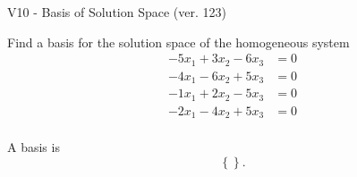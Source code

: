 \begin{exercise}
  \begin{exerciseTitle}V10 - Basis of Solution Space (ver. 123)\end{exerciseTitle}
  \begin{exerciseStatement}
    Find a basis for the solution space of the homogeneous system 
\begin{align*}
 -5 x_ 1 + 3 x_ 2 -6 x_ 3 &= 0  \\ 
  -4 x_ 1 -6 x_ 2 + 5 x_ 3 &= 0  \\ 
  -1 x_ 1 + 2 x_ 2 -5 x_ 3 &= 0  \\ 
  -2 x_ 1 -4 x_ 2 + 5 x_ 3 &= 0  \\ 
 \end{align*}


 
  \end{exerciseStatement}

  \begin{exerciseAnswer}
   A basis is   
\[\left\{\right\}.\]

  


  \end{exerciseAnswer}
\end{exercise}